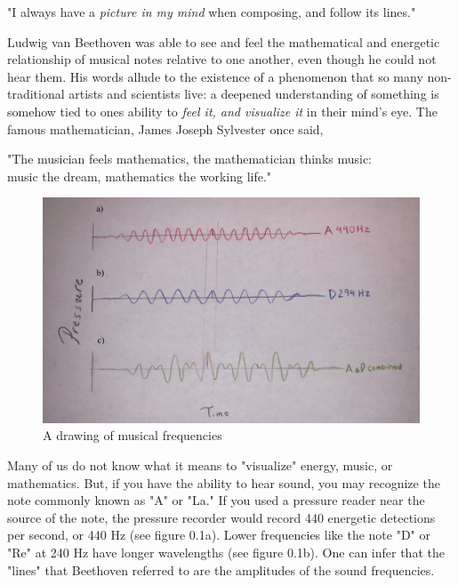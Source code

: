 \documentclass[12pt]{ucsddissertation}
\begin{document}
\begin{dissertationintroduction}
\begin{center}
    "I always have a \textit{picture in my mind} when composing, and follow its lines."
\end{center}

Ludwig van Beethoven was able to see and feel the mathematical and energetic relationship of musical notes relative to one another, even though he could not hear them. His words allude to the existence of a phenomenon that so many non-traditional artists and scientists live: a deepened understanding of something is somehow tied to ones ability to \textit{feel it, and visualize it} in their mind's eye. The famous mathematician, James Joseph Sylvester once said, 

\begin{center}
    "The musician feels mathematics, the mathematician thinks music: \\ music the dream, mathematics the working life."
\end{center}

\begin{figure}
\centering
        \includegraphics[scale=0.1]{frequencies.jpeg}
        \caption{A drawing of musical frequencies}
\label{fig:frequencies of music}
\end{figure}

Many of us do not know what it means to "visualize" energy, music, or mathematics. But, if you have the ability to hear sound, you may recognize the note commonly known as "A" or "La." If you used a pressure reader near the source of the note, the pressure recorder would record 440 energetic detections per second, or 440 Hz (see figure 0.1a). Lower frequencies like the note "D" or "Re" at 240 Hz have longer wavelengths (see figure 0.1b). One can infer that the "lines" that Beethoven referred to are the amplitudes of the sound frequencies. 


\end{dissertationintroduction}
\end{document}
